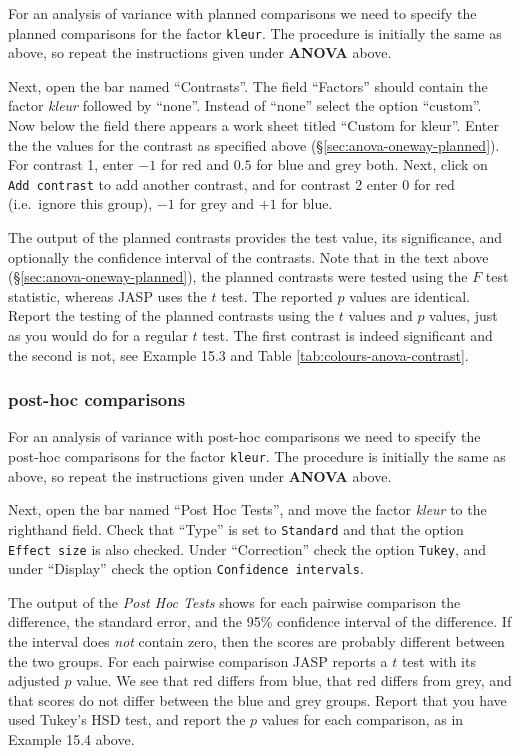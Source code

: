\documentclass[
]{book}
\begin{document}
For an analysis of variance with planned comparisons we need to specify the planned comparisons for the factor \texttt{kleur}. The procedure is initially the same as above, so repeat the instructions given under \textbf{ANOVA} above.

Next, open the bar named ``Contrasts''. The field ``Factors'' should contain the factor \emph{kleur} followed by ``none''.
Instead of ``none'' select the option ``custom''. Now below the field there appears a work sheet titled ``Custom for kleur''. Enter the the values for the contrast as specified above (§\ref{sec:anova-oneway-planned}). For contrast 1, enter \(-1\) for red and \(0.5\) for blue and grey both. Next, click on \texttt{Add\ contrast} to add another contrast, and for contrast 2 enter \(0\) for red (i.e.~ignore this group), \(-1\) for grey and \(+1\) for blue.

The output of the planned contrasts provides the test value, its significance, and optionally the confidence interval of the contrasts. Note that in the text above (§\ref{sec:anova-oneway-planned}), the planned contrasts were tested using the \(F\) test statistic, whereas JASP uses the \(t\) test. The reported \(p\) values are identical. Report the testing of the planned contrasts using the \(t\) values and \(p\) values, just as you would do for a regular \(t\) test.
The first contrast is indeed significant and the second is not, see Example 15.3 and Table \ref{tab:colours-anova-contrast}.

\subsubsection{post-hoc comparisons}\label{post-hoc-comparisons}

For an analysis of variance with post-hoc comparisons we need to specify the post-hoc comparisons for the factor \texttt{kleur}. The procedure is initially the same as above, so repeat the instructions given under \textbf{ANOVA} above.

Next, open the bar named ``Post Hoc Tests'', and move the factor \emph{kleur} to the righthand field.
Check that ``Type'' is set to \texttt{Standard} and that the option \texttt{Effect\ size} is also checked.
Under ``Correction'' check the option \texttt{Tukey}, and under ``Display'' check the option \texttt{Confidence\ intervals}.

The output of the \emph{Post Hoc Tests} shows for each pairwise comparison the difference, the standard error, and the 95\% confidence interval of the difference. If the interval does \emph{not} contain zero, then the scores are probably different between the two groups. For each pairwise comparison JASP reports a \(t\) test with its adjusted \(p\) value. We see that red differs from blue, that red differs from grey, and that scores do not differ between the blue and grey groups. Report that you have used Tukey's HSD test, and report the \(p\) values for each comparison, as in Example 15.4 above.
\end{document}
